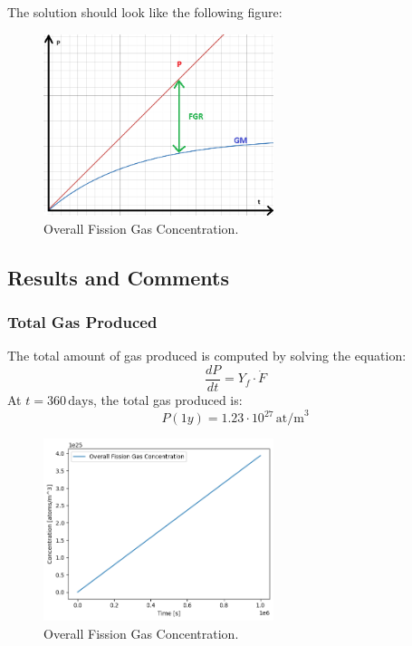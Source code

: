 The solution should look like the following figure:
\begin{figure}[H]
    \centering
    \includegraphics[width=0.6\textwidth]{FGR_plot.png}
    \caption{Overall Fission Gas Concentration.}
    \label{fig:FGR_plot}
\end{figure}

\subsection{Results and Comments}

\subsubsection{Total Gas Produced}

The total amount of gas produced is computed by solving the equation:
\begin{equation}
    \frac{dP}{dt} = Y_f \cdot \dot{F}
\end{equation}
At $t = 360 \, \text{days}$, the total gas produced is:
\[
P(1y) = 1.23 \cdot 10^{27} \, \text{at/m}^3
\]

\begin{figure}[H]
    \centering
    \includegraphics[width=0.6\textwidth]{FGR_1.png}
    \caption{Overall Fission Gas Concentration.}
    \label{fig:FGR_1}
\end{figure}

